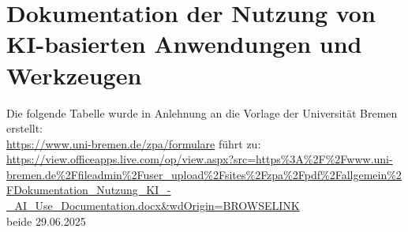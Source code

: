 
\section{Dokumentation der Nutzung von KI-basierten Anwendungen und Werkzeugen}
Die folgende Tabelle wurde in Anlehnung an die Vorlage der Universität Bremen erstellt:
\\

\footnotesize{
    \url{https://www.uni-bremen.de/zpa/formulare} führt zu: 
    \\

    \url{https://view.officeapps.live.com/op/view.aspx?src=https%3A%2F%2Fwww.uni-bremen.de%2Ffileadmin%2Fuser_upload%2Fsites%2Fzpa%2Fpdf%2Fallgemein%2FDokumentation_Nutzung_KI_-_AI_Use_Documentation.docx&wdOrigin=BROWSELINK} 
    \\
    
    beide 29.06.2025
    }


\clearpage



